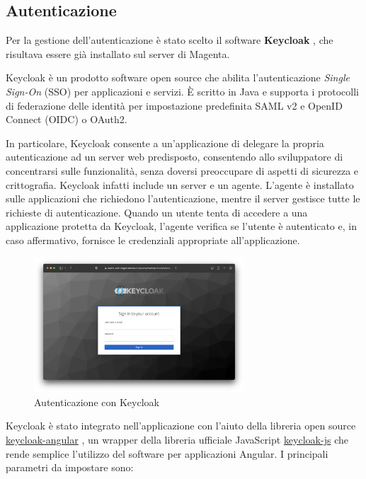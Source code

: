 \subsection{Autenticazione}\label{sec:autenticazione}
Per la gestione dell'autenticazione è stato scelto il software \textbf{Keycloak} \cite{keycloak}, che risultava essere già installato sul server di Magenta.

Keycloak è un prodotto software open source che abilita l'autenticazione \textit{Single Sign-On} (SSO) per applicazioni e servizi. È scritto in Java e supporta i protocolli di federazione delle identità per impostazione predefinita SAML v2 e OpenID Connect (OIDC) o OAuth2. \cite{keycloak}

In particolare, Keycloak consente a un'applicazione di delegare la propria autenticazione ad un server web predisposto, consentendo allo sviluppatore di concentrarsi sulle funzionalità, senza doversi preoccupare di aspetti di sicurezza e crittografia. Keycloak infatti include un server e un agente. L'agente è installato sulle applicazioni che richiedono l'autenticazione, mentre il server gestisce tutte le richieste di autenticazione. Quando un utente tenta di accedere a una applicazione protetta da Keycloak, l'agente verifica se l'utente è autenticato e, in caso affermativo, fornisce le credenziali appropriate all'applicazione.

\begin{figure}[H]
\centering
\includegraphics[width=0.70\textwidth,height=\textheight,keepaspectratio]{img/keycloak}
\caption{Autenticazione con Keycloak}
\label{fig:keycloak}
\end{figure}

Keycloak è stato integrato nell'applicazione con l'aiuto della libreria open source \url{keycloak-angular} \cite{keycloak-angular}, un wrapper della libreria ufficiale JavaScript \url{keycloak-js} \cite{keycloak-js} che rende semplice l'utilizzo del software per applicazioni Angular. I principali parametri da impostare sono:

